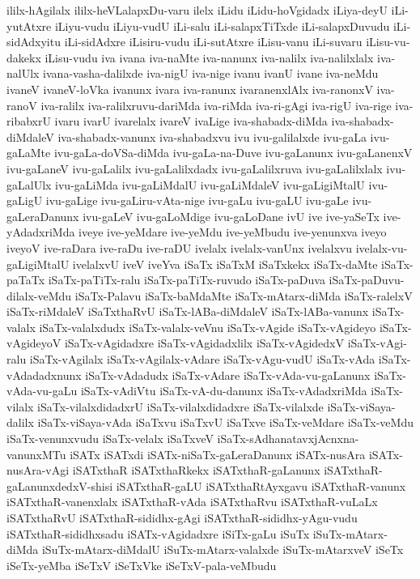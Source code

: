 {ililx-hAgilalx
ililx-heVLalapxDu-varu
ilelx
iLidu
iLidu-hoVgidadx
iLiya-deyU
iLi-yutAtxre
iLiyu-vudu
iLiyu-vudU
iLi-salu
iLi-salapxTiTxde
iLi-salapxDuvudu
iLi-sidAdxyitu
iLi-sidAdxre
iLisiru-vudu
iLi-sutAtxre
iLisu-vanu
iLi-suvaru
iLisu-vu-dakekx
iLisu-vudu
iva
ivana
iva-naMte
iva-nanunx
iva-nalilx
iva-nalilxlalx
iva-nalUlx
ivana-vasha-dalilxde
iva-nigU
iva-nige
ivanu
ivanU
ivane
iva-neMdu
ivaneV
ivaneV-loVka
ivanunx
ivara
iva-ranunx
ivaranenxlAlx
iva-ranonxV
iva-ranoV
iva-ralilx
iva-ralilxruvu-dariMda
iva-riMda
iva-ri-gAgi
iva-rigU
iva-rige
iva-ribabxrU
ivaru
ivarU
ivarelalx
ivareV
ivaLige
iva-shabadx-diMda
iva-shabadx-diMdaleV
iva-shabadx-vanunx
iva-shabadxvu
ivu
ivu-galilalxde
ivu-gaLa
ivu-gaLaMte
ivu-gaLa-doVSa-diMda
ivu-gaLa-na-Duve
ivu-gaLanunx
ivu-gaLanenxV
ivu-gaLaneV
ivu-gaLalilx
ivu-gaLalilxdadx
ivu-gaLalilxruva
ivu-gaLalilxlalx
ivu-gaLalUlx
ivu-gaLiMda
ivu-gaLiMdalU
ivu-gaLiMdaleV
ivu-gaLigiMtalU
ivu-gaLigU
ivu-gaLige
ivu-gaLiru-vAta-nige
ivu-gaLu
ivu-gaLU
ivu-gaLe
ivu-gaLeraDanunx
ivu-gaLeV
ivu-gaLoMdige
ivu-gaLoDane
ivU
ive
ive-yaSeTx
ive-yAdadxriMda
iveye
ive-yeMdare
ive-yeMdu
ive-yeMbudu
ive-yenunxva
iveyo
iveyoV
ive-raDara
ive-raDu
ive-raDU
ivelalx
ivelalx-vanUnx
ivelalxvu
ivelalx-vu-gaLigiMtalU
ivelalxvU
iveV
iveYva
iSaTx
iSaTxM
iSaTxkekx
iSaTx-daMte
iSaTx-paTaTx
iSaTx-paTiTx-ralu
iSaTx-paTiTx-ruvudo
iSaTx-paDuva
iSaTx-paDuvu-dilalx-veMdu
iSaTx-Palavu
iSaTx-baMdaMte
iSaTx-mAtarx-diMda
iSaTx-ralelxV
iSaTx-riMdaleV
iSaTxthaRvU
iSaTx-lABa-diMdaleV
iSaTx-lABa-vanunx
iSaTx-valalx
iSaTx-valalxdudx
iSaTx-valalx-veVnu
iSaTx-vAgide
iSaTx-vAgideyo
iSaTx-vAgideyoV
iSaTx-vAgidadxre
iSaTx-vAgidadxlilx
iSaTx-vAgidedxV
iSaTx-vAgi-ralu
iSaTx-vAgilalx
iSaTx-vAgilalx-vAdare
iSaTx-vAgu-vudU
iSaTx-vAda
iSaTx-vAdadadxnunx
iSaTx-vAdadudx
iSaTx-vAdare
iSaTx-vAda-vu-gaLanunx
iSaTx-vAda-vu-gaLu
iSaTx-vAdiVtu
iSaTx-vA-du-danunx
iSaTx-vAdadxriMda
iSaTx-vilalx
iSaTx-vilalxdidadxrU
iSaTx-vilalxdidadxre
iSaTx-vilalxde
iSaTx-viSaya-dalilx
iSaTx-viSaya-vAda
iSaTxvu
iSaTxvU
iSaTxve
iSaTx-veMdare
iSaTx-veMdu
iSaTx-venunxvudu
iSaTx-velalx
iSaTxveV
iSaTx-sAdhanatavxjAcnxna-vanunxMTu
iSATx
iSATxdi
iSATx-niSaTx-gaLeraDanunx
iSATx-nusAra
iSATx-nusAra-vAgi
iSATxthaR
iSATxthaRkekx
iSATxthaR-gaLanunx
iSATxthaR-gaLanunxdedxV-shisi
iSATxthaR-gaLU
iSATxthaRtAyxgavu
iSATxthaR-vanunx
iSATxthaR-vanenxlalx
iSATxthaR-vAda
iSATxthaRvu
iSATxthaR-vuLaLx
iSATxthaRvU
iSATxthaR-sididhx-gAgi
iSATxthaR-sididhx-yAgu-vudu
iSATxthaR-sididhxsadu
iSATx-vAgidadxre
iSiTx-gaLu
iSuTx
iSuTx-mAtarx-diMda
iSuTx-mAtarx-diMdalU
iSuTx-mAtarx-valalxde
iSuTx-mAtarxveV
iSeTx
iSeTx-yeMba
iSeTxV
iSeTxVke
iSeTxV-pala-veMbudu
}
